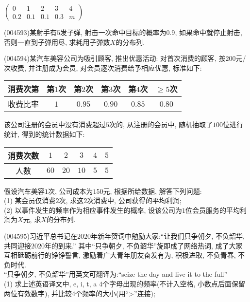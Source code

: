 \begin{center}
    $\begin{pmatrix}
        0 & 1 & 2 & 3 & 4 \\ 
        0.2 & 0.1 & 0.1 & 0.3 & m 
    \end{pmatrix}$
\end{center}
\item (004593)某射手有$5$发子弹, 射击一次命中目标的概率为$0.9$, 如果命中就停止射击, 否则一直到子弹用尽, 求耗用子弹数$X$的分布列.
\item (004594)某汽车美容公司为吸引顾客, 推出优惠活动: 对首次消费的顾客, 按$200$元/次收费, 并注册成为会员, 对会员逐次消费给予相应优惠, 标准如下:\\
\begin{center}
    \begin{tabular}{|c|c|c|c|c|c|}
        \hline
        消费次第 & 第$1$次 & 第$2$次 & 第$3$次 & 第$4$次 & $\ge 5$次 \\ \hline
        收费比率 & $1$ & $0.95$ & $0.90$ & $0.85$ & $0.80$\\ \hline
    \end{tabular}
\end{center}
该公司注册的会员中没有消费超过$5$次的, 从注册的会员中, 随机抽取了$100$位进行统计, 得到的统计数据如下:
\begin{center}
    \begin{tabular}{|c|c|c|c|c|c|}
        \hline
        消费次数 & $1$ & $2$ & $3$ & $4$ & $5$ \\ \hline
        人数 & $60$ & $20$ & $10$ & $5$ & $5$\\ \hline
    \end{tabular}
\end{center}
假设汽车美容$1$次, 公司成本为$150$元, 根据所给数据, 解答下列问题:\\
(1) 某会员仅消费$2$次, 求这$2$次消费中, 公司获得的平均利润;\\
(2) 以事件发生的频率作为相应事件发生的概率, 设该公司为$1$位会员服务的平均利润为$X$元, 求$X$的分布列.
\item (004595)习近平总书记在$2020$年新年贺词中勉励大家:``让我们只争朝夕, 不负韶华, 共同迎接$2020$年的到来.'' 其中``只争朝夕, 不负韶华''旋即成了网络热词, 成了大家互相砥砺前行的铮铮誓言, 激励着广大青年朋友奋发有为, 积极进取, 不负青春, 不负时代.\\
``只争朝夕, 不负韶华''用英文可翻译为:``seize the day and live it to the full''\\
(1) 求上述英语译文中, e, i, t, a $4$个字母出现的频率(不计入空格, 小数点后面保留两位有效数字), 并比较$4$个频率的大小(用``>''连接);\\
